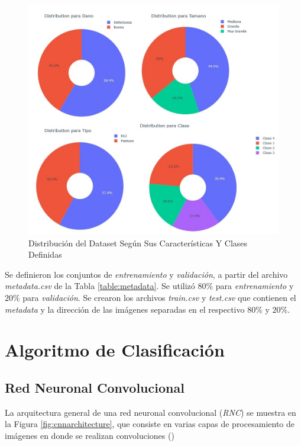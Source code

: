 \begin{figure}[ht]
	\centering
	\includegraphics[scale=0.5]{Figs/Distribucion.jpg}
	\caption{Distribución del Dataset Según Sus Características Y Clases Definidas}
	\label{fig:distribuciontipo}
\end{figure}

Se definieron los conjuntos de \textit{entrenamiento} y \textit{validación}, a partir del archivo \textit{metadata.csv} de la Tabla \ref{table:metadata}. Se utilizó $80\%$ para \textit{entrenamiento} y $20\%$ para \textit{validación}. Se crearon los archivos \textit{train.csv} y \textit{test.csv} que contienen el \textit{metadata} y la dirección de las imágenes separadas en el respectivo $80\%$ y $20\%$.\\





\chapter{Algoritmo de Clasificación}

\section{Red Neuronal Convolucional}

La arquitectura general de una red neuronal convolucional (\textit{RNC}) se muestra en la Figura \ref{fig:cnnarchitecture}, que consiste en varias capas de procesamiento de imágenes en donde se realizan convoluciones () \cite{o2015introduction}

